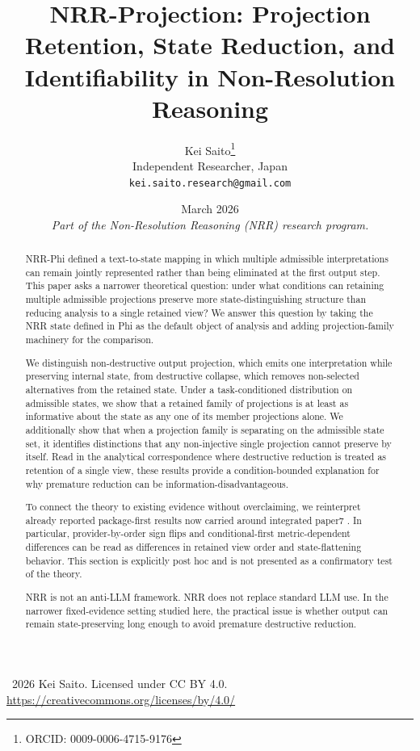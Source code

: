 \documentclass[11pt,a4paper]{article}
\title{\textbf{NRR-Projection: Projection Retention, State Reduction, and Identifiability in Non-Resolution Reasoning}}
\author{
  Kei Saito\thanks{ORCID: 0009-0006-4715-9176} \\
  Independent Researcher, Japan \\
  \texttt{kei.saito.research@gmail.com}
}
\date{March 2026 \\[0.5em]
\textit{Part of the Non-Resolution Reasoning (NRR) research program.}}
\begin{document}
\maketitle

\begin{center}
\textcopyright\ 2026 Kei Saito.
Licensed under CC BY 4.0.\\
\url{https://creativecommons.org/licenses/by/4.0/}
\end{center}

\begin{abstract}
NRR-Phi \cite{saito2026phi} defined a text-to-state mapping in which multiple admissible interpretations can remain jointly represented rather than being eliminated at the first output step. This paper asks a narrower theoretical question: under what conditions can retaining multiple admissible projections preserve more state-distinguishing structure than reducing analysis to a single retained view? We answer this question by taking the NRR state defined in Phi as the default object of analysis and adding projection-family machinery for the comparison.

We distinguish non-destructive output projection, which emits one interpretation while preserving internal state, from destructive collapse, which removes non-selected alternatives from the retained state. Under a task-conditioned distribution on admissible states, we show that a retained family of projections is at least as informative about the state as any one of its member projections alone. We additionally show that when a projection family is separating on the admissible state set, it identifies distinctions that any non-injective single projection cannot preserve by itself. Read in the analytical correspondence where destructive reduction is treated as retention of a single view, these results provide a condition-bounded explanation for why premature reduction can be information-disadvantageous.

To connect the theory to existing evidence without overclaiming, we reinterpret already reported package-first results now carried around integrated paper7 \cite{saito2026boundary}. In particular, provider-by-order sign flips and conditional-first metric-dependent differences can be read as differences in retained view order and state-flattening behavior. This section is explicitly post hoc and is not presented as a confirmatory test of the theory.

NRR is not an anti-LLM framework. NRR does not replace standard LLM use. In the narrower fixed-evidence setting studied here, the practical issue is whether output can remain state-preserving long enough to avoid premature destructive reduction.
\end{abstract}
\end{document}

